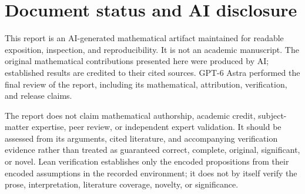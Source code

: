 \section{Document status and AI disclosure}
This report is an AI-generated mathematical artifact maintained for readable exposition, inspection, and reproducibility. It is not an academic manuscript. The original mathematical contributions presented here were produced by AI; established results are credited to their cited sources. GPT-6 Astra performed the final review of the report, including its mathematical, attribution, verification, and release claims.

The report does not claim mathematical authorship, academic credit, subject-matter expertise, peer review, or independent expert validation. It should be assessed from its arguments, cited literature, and accompanying verification evidence rather than treated as guaranteed correct, complete, original, significant, or novel. Lean verification establishes only the encoded propositions from their encoded assumptions in the recorded environment; it does not by itself verify the prose, interpretation, literature coverage, novelty, or significance.

